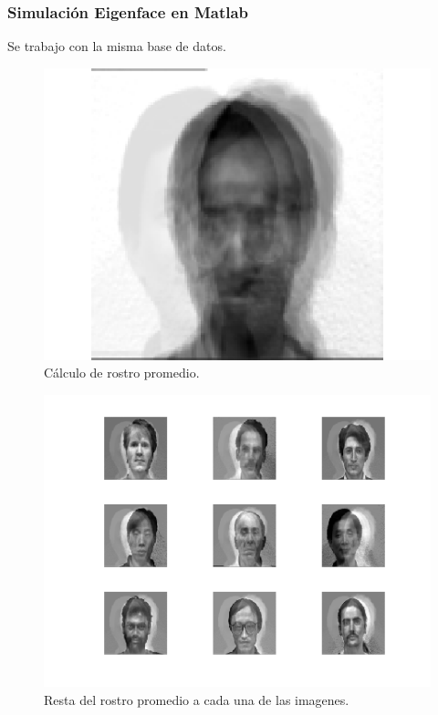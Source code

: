 \documentclass[letterpaper,12pt]{article}
\begin{document}
\subsubsection{Simulación Eigenface en Matlab}
Se trabajo con la misma base de datos.
\begin{figure}[H]
 \centering
 \includegraphics[scale=0.3,keepaspectratio=true]{Figs/PromedioEi.png}
\caption{Cálculo de rostro promedio.}
 \label{Fig:Prom}
\end{figure}


\begin{figure}[H]
 \centering
 \includegraphics[scale=0.95,keepaspectratio=true]{Figs/RestaPromEi.png}
\caption{Resta del rostro promedio a cada una de las imagenes.}
 \label{Fig:ResProm}
\end{figure}
\end{document}
